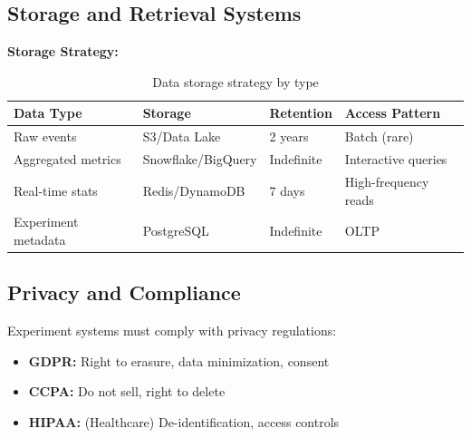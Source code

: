 \subsection{Storage and Retrieval Systems}

\textbf{Storage Strategy:}

\begin{table}[h]
\centering
\begin{tabular}{llll}
\toprule
\textbf{Data Type} & \textbf{Storage} & \textbf{Retention} & \textbf{Access Pattern} \\
\midrule
Raw events & S3/Data Lake & 2 years & Batch (rare) \\
Aggregated metrics & Snowflake/BigQuery & Indefinite & Interactive queries \\
Real-time stats & Redis/DynamoDB & 7 days & High-frequency reads \\
Experiment metadata & PostgreSQL & Indefinite & OLTP \\
\bottomrule
\end{tabular}
\caption{Data storage strategy by type}
\end{table}

\subsection{Privacy and Compliance}

Experiment systems must comply with privacy regulations:

\begin{itemize}
    \item \textbf{GDPR:} Right to erasure, data minimization, consent
    \item \textbf{CCPA:} Do not sell, right to delete
    \item \textbf{HIPAA:} (Healthcare) De-identification, access controls
\end{itemize}

